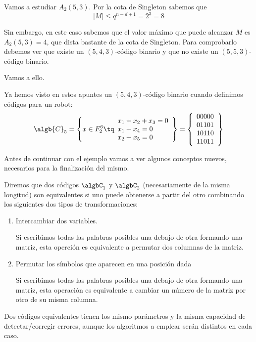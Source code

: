 \begin{example}
Vamos a estudiar $A_2(5,3)$. Por la cota de Singleton sabemos que
\[|M| \leq q^{n-d+1} = 2^3=8\]

Sin embargo, en este caso sabemos que el valor máximo que puede alcanzar $M$ es $A_2(5,3)=4$, que dista bastante de la cota de Singleton. Para comprobarlo debemos ver que existe un $(5,4,3)$-código binario y que no existe un $(5,5,3)$-código binario.

Vamos a ello.

Ya hemos visto en estos apuntes un $(5,4,3)$-código binario cuando definimos códigos para un robot:
\[\algb{C}_5 = \left\{x\in F_2^6 \tq  \begin{array}{l}
x_1+x_2+x_3= 0 \\
x_1+x_4 = 0 \\
x_2+x_5 = 0
\end{array}\right\}=\left\{\begin{array}{l}
00000\\
01101\\
10110\\
11011
\end{array}\right\}\]

\end{example}

Antes de continuar con el ejemplo vamos a ver algunos conceptos nuevos, necesarios para la finalización del mismo.

\begin{defn}
Diremos que dos códigos $\algbC_1$ y $\algbC_2$ (necesariamente de la misma longitud) son equivalentes si uno puede obtenerse a partir del otro combinando los siguientes dos tipos de transformaciones:
\begin{enumerate}
\item Intercambiar dos variables.

Si escribimos todas las palabras posibles una debajo de otra formando una matriz, esta operción es equivalente a permutar dos columnas de la matriz.

\item Permutar los símbolos que aparecen en una posición dada

Si escribimos todas las palabras posibles una debajo de otra formando una matriz, esta operación es equivalente a cambiar un número de la matriz por otro de su misma columna.
\end{enumerate}
\end{defn}

\begin{prop}
Dos códigos equivalentes tienen los mismo parámetros y la misma capacidad de detectar/corregir errores, aunque los algoritmos a emplear serán distintos en cada caso.
\end{prop}

